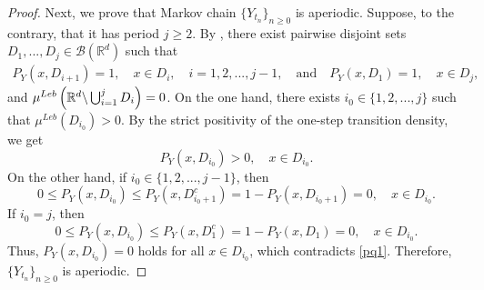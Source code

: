 \documentclass[preprint,12pt,compress]{elsarticle}
\begin{document}
\begin{proof}
Next, we prove that Markov chain ${\{ {Y_{{t_n}}}\} _{n \ge 0}}$ is aperiodic. Suppose, to the contrary, that it has period $j \ge 2$. By \cite[Theorem 5.4.4, p. 113]{meyn2009markov}, there exist pairwise disjoint sets $D_1, ..., D_j \in \mathcal{B}(\mathbb{R}^d)$ such that
\begin{equation*}
	\begin{split}
		{{P}_Y}(x,{D_{i + 1}}) = 1, \quad x \in D_i, \quad i=1,2,...,j-1, \quad \text{and} \quad
		{{P}_Y}(x,{D_1}) = 1,\quad  x \in D_j,
	\end{split} 
\end{equation*}
and ${\mu ^{Leb}}\left( {{\mathbb{R}^d}{\rm{\backslash }}\bigcup\nolimits_{i = 1}^j {{D_i}} } \right) = 0$.
On the one hand, there exists ${i_0} \in \{ 1,2,...,j\} $ such that $\mu^{Leb}(D_{i_0}) > 0$. 
By the strict positivity of the one-step transition density, we get
\begin{equation}	\label{pq1}
	{P}_Y(x,{D_{i_0}}) > 0 , \quad x \in D_{i_0}.
\end{equation}
On the other hand, if ${i_0} \in \{ 1,2,...,j-1\} $, then 
\begin{equation*}
	0 \le {{P}_Y}(x,{D_{{i_0}}}) \le {{P}_Y}(x,D_{{i_0} + 1}^c) = 1 - {{P}_Y}(x,{D_{{i_0} + 1}}) = 0, \quad x \in D_{i_0}.
\end{equation*}
If $i_0 = j$, then
\begin{equation*}
	0 \le {{P}_Y}(x,{D_{{i_0}}}) \le {{P}_Y}(x,D_1^c) = 1 - {{P}_Y}(x,{D_1}) = 0, \quad x \in D_{i_0}.
\end{equation*}
Thus, ${{P}_Y}(x,{D_{{i_0}}}) = 0$ holds for all $x \in D_{i_0}$, which contradicts \eqref{pq1}. Therefore, ${\{ {Y_{{t_n}}}\} _{n \ge 0}}$ is aperiodic.


\end{proof}
\end{document}
